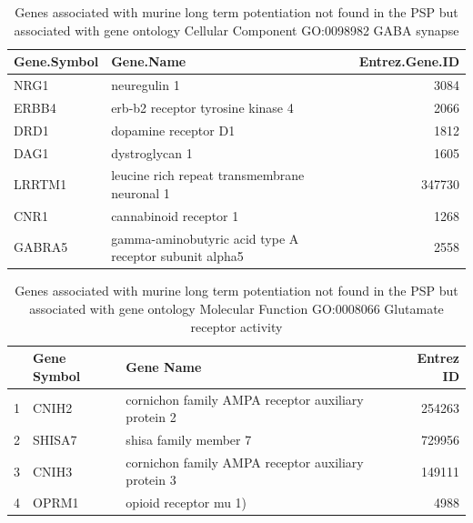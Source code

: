 \begin{table}[ht]
\centering
\begin{tabular}{llr}
  \hline
Gene.Symbol & Gene.Name & Entrez.Gene.ID \\ 
  \hline
NRG1 & neuregulin 1 & 3084 \\ 
  ERBB4 & erb-b2 receptor tyrosine kinase 4 & 2066 \\ 
  DRD1 & dopamine receptor D1 & 1812 \\ 
  DAG1 & dystroglycan 1 & 1605 \\ 
  LRRTM1 & leucine rich repeat transmembrane neuronal 1 & 347730 \\ 
  CNR1 & cannabinoid receptor 1 & 1268 \\ 
  GABRA5 & gamma-aminobutyric acid type A receptor subunit alpha5 & 2558 \\ 
   \hline
\end{tabular}
 \caption{Genes associated with murine long term potentiation not found in the PSP but associated with gene ontology Cellular Component GO:0098982 GABA synapse}
 \label{tab:Genes associated with murine long term potentiation not found in the PSP but associated with gene ontology Cellular Component GO:0098982 GABA synapse}
\end{table}



\begin{table}[ht]
\centering
\begin{tabular}{rllr}
  \hline
 & Gene Symbol & Gene Name & Entrez ID \\ 
  \hline
1 & CNIH2 & cornichon family AMPA receptor auxiliary protein 2 & 254263 \\ 
  2 & SHISA7 &  shisa family member 7 & 729956 \\ 
  3 & CNIH3 & cornichon family AMPA receptor auxiliary protein 3 & 149111 \\ 
  4 & OPRM1 & opioid receptor mu 1) & 4988 \\ 
   \hline
\end{tabular}
\caption{Genes associated with murine long term potentiation not found in the PSP but associated with gene ontology Molecular Function GO:0008066 Glutamate receptor activity}
\label{tab: Genes associated with murine long term potentiation not found in the PSP but associated with gene ontology Molecular Function GO:0008066 Glutamate receptor activity}
\end{table}



